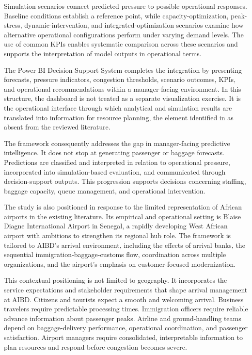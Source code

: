 Simulation scenarios connect predicted pressure to possible operational responses. Baseline conditions establish a reference point, while capacity-optimization, peak-stress, dynamic-intervention, and integrated-optimization scenarios examine how alternative operational configurations perform under varying demand levels. The use of common KPIs enables systematic comparison across these scenarios and supports the interpretation of model outputs in operational terms.

The Power BI Decision Support System completes the integration by presenting forecasts, pressure indicators, congestion thresholds, scenario outcomes, KPIs, and operational recommendations within a manager-facing environment. In this structure, the dashboard is not treated as a separate visualization exercise. It is the operational interface through which analytical and simulation results are translated into information for resource planning, the element identified in  as absent from the reviewed literature.

The framework consequently addresses the gap in manager-facing predictive intelligence. It does not stop at generating passenger or baggage forecasts. Predictions are classified and interpreted in relation to operational pressure, incorporated into simulation-based evaluation, and communicated through decision-support outputs. This progression supports decisions concerning staffing, baggage capacity, queue management, and operational intervention.

The study is also positioned in response to the limited representation of African airports in the existing literature. Its empirical and operational setting is Blaise Diagne International Airport in Senegal, a rapidly developing West African airport with ambitions to strengthen its regional hub role. The framework is tailored to AIBD's arrival environment, including the effects of arrival banks, the sequential immigration-baggage-customs flow, coordination across multiple organizations, and the airport's emphasis on customer-focused modernization.

This contextual positioning is not limited to geography. It incorporates the service expectations and stakeholder requirements that shape arrival management at AIBD. Citizens and tourists expect a smooth and welcoming arrival. Business travelers require predictable processing times. Immigration officers require reliable advance information about passenger peaks. Airline and ground-handling teams depend on baggage-delivery performance, operational coordination, and passenger satisfaction. Airport managers require consolidated, interpretable information to plan resources and respond before congestion becomes severe.

